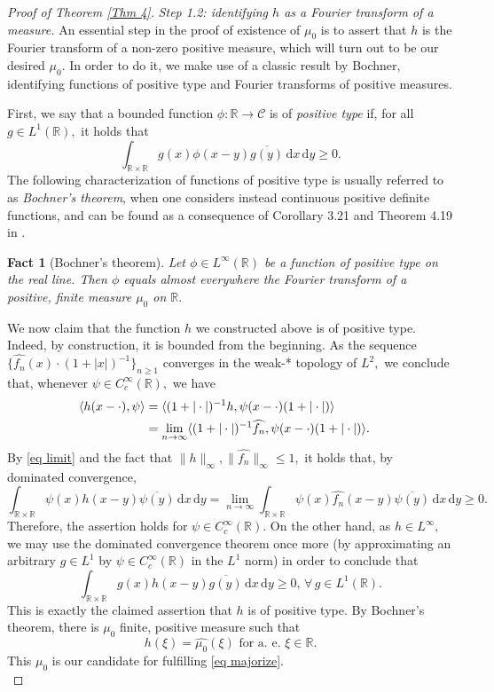 \documentclass[11pt, reqno]{amsart}
\newcommand{\mmd}{ \mathrm{d}}
\numberwithin{equation}{section}
\newtheorem{fact}[theorem]{Fact}
\newcommand{\R}{{\mathbb R}}
\newcommand{\C}{{\mathcal C}}
\begin{document}
\begin{proof}[Proof of Theorem \ref{Thm 4}]
\noindent\textit{Step 1.2: identifying $h$ as a Fourier transform of a measure.} An essential step in the proof of existence of $\mu_0$ is to assert that $h$ is the Fourier transform of a non-zero positive measure, which will turn out to be our desired $\mu_0.$ In order to do it, we make use of a classic result by Bochner, identifying functions of positive type and Fourier transforms of positive measures. 

First, we say that a bounded function $\phi : \R \to \C$ is of \emph{positive type} if, for all $g \in L^1(\R),$ it holds that 
\[
\int_{\R\times \R} g(x) \phi(x-y) \overline{g(y)} \, \mmd x \, \mmd y \ge 0.
\]
The following characterization of functions of positive type is usually referred to as \emph{Bochner's theorem}, when one considers instead continuous positive definite functions, and can be found 
as a consequence of Corollary 3.21 and Theorem 4.19 in \cite{Folland}.

\begin{fact}[Bochner's theorem] Let $\phi \in L^{\infty}(\R)$ be a function of positive type on the real line. Then $\phi$ equals almost everywhere the Fourier transform of a positive, finite measure 
$\mu_0$ on $\R.$ 
\end{fact}
We now claim that the function $h$ we constructed above is of positive type. Indeed, by construction, it is bounded from the beginning. As the sequence $\{\widehat{f_n}(x) \cdot (1+|x|)^{-1}\}_{n\ge 1}$ 
converges in the weak-* topology of $L^2,$ we conclude that, whenever $\psi \in C^{\infty}_c(\R),$ we have 
\begin{align}\label{eq limit}
\langle h(x-\cdot), \psi \rangle & = \langle (1+|\cdot|)^{-1}h, \psi(x-\cdot) (1+|\cdot|) \rangle \cr
& = \lim_{n \to \infty} \langle(1+|\cdot|)^{-1} \widehat{f_n}, \psi(x-\cdot) (1+|\cdot|) \rangle. \cr 
\end{align}
By \eqref{eq limit} and the fact that $\|h\|_{\infty},\|\widehat{f_n}\|_{\infty} \le 1,$ it holds that, by dominated convergence, 
\[
\int_{\R \times \R} \psi(x) h(x-y) \overline{\psi(y)} \, \mmd x \, \mmd y = \lim_{n \to \infty} \int_{\R \times \R} \psi(x) \widehat{f_n}(x-y) \overline{\psi(y)} \, \mmd x \, \mmd y \ge 0. 
\]
Therefore, the assertion holds for $\psi \in C^{\infty}_c(\R).$ On the other hand, as $h \in L^{\infty},$ we may use the dominated convergence theorem once more (by approximating an arbitrary $g \in L^1$ 
by $\psi \in C^{\infty}_c(\R)$ in the $L^1$ norm) in order to conclude that 
\[
\int_{\R \times \R} g(x) h(x-y) \overline{g(y)} \, \mmd x \, \mmd y \ge 0, \, \forall \, g \in L^1(\R).
\]
This is exactly the claimed assertion that $h$ is of positive type. By Bochner's theorem, there is $\mu_0$ finite, positive measure such that 
\[
h(\xi) = \widehat{\mu_0}(\xi) \text{ for a. e. } \xi \in \R. 
\]
This $\mu_0$ is our candidate for fulfilling \eqref{eq majorize}. \\


\end{proof}
\end{document}
